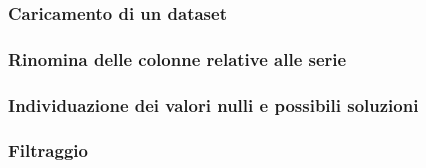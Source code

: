 \subsubsection{Caricamento di un dataset}





\subsubsection{Rinomina delle colonne relative alle serie}
\subsubsection{Individuazione dei valori nulli e possibili soluzioni}
\subsubsection{Filtraggio}


